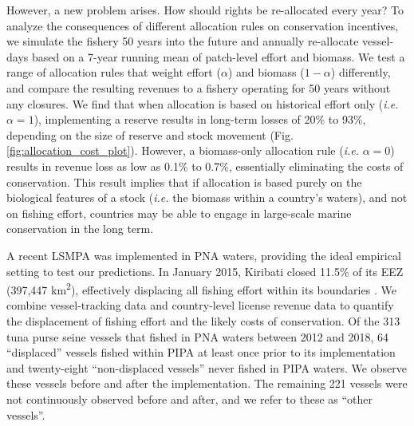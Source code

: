 \documentclass[12pt]{article}
\begin{document}
However, a new problem arises. How should rights be re-allocated every year? To analyze the consequences of different allocation rules on conservation incentives, we simulate the fishery 50 years into the future and annually re-allocate vessel-days based on a 7-year running mean of patch-level effort and biomass. We test a range of allocation rules that weight effort ($\alpha$) and biomass ($1 - \alpha$) differently, and compare the resulting revenues to a fishery operating for 50 years without any closures. We find that when allocation is based on historical effort only (\emph{i.e.} $\alpha = 1$), implementing a reserve results in long-term losses of 20\% to 93\%, depending on the size of reserve and stock movement (Fig. \ref{fig:allocation_cost_plot}). However, a biomass-only allocation rule (\emph{i.e.} $\alpha = 0$) results in revenue loss as low as 0.1\% to 0.7\%, essentially eliminating the costs of conservation. This result implies that if allocation is based purely on the biological features of a stock (\emph{i.e.} the biomass within a country's waters), and not on fishing effort, countries may be able to engage in large-scale marine conservation in the long term.

A recent LSMPA was implemented in PNA waters, providing the ideal empirical setting to test our predictions. In January 2015, Kiribati closed 11.5\% of its EEZ (397,447 km\textsuperscript{2}), effectively displacing all fishing effort within its boundaries \cite{mccauley_2016,mcdermott_2018}. We combine vessel-tracking data \cite{kroodsma_2018} and country-level license revenue data \cite{ffa_2017} to quantify the displacement of fishing effort and the likely costs of conservation. Of the 313 tuna purse seine vessels that fished in PNA waters between 2012 and 2018, 64 ``displaced'' vessels fished within PIPA at least once prior to its implementation and twenty-eight ``non-displaced vessels'' never fished in PIPA waters. We observe these vessels before and after the implementation. The remaining 221 vessels were not continuously observed before and after, and we refer to these as ``other vessels''.
\end{document}

